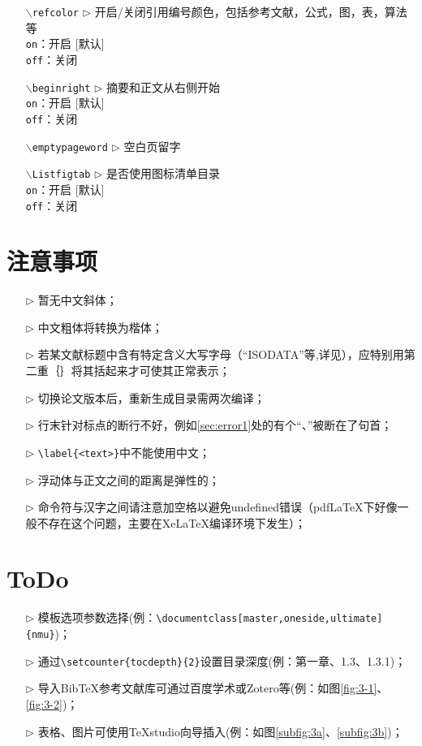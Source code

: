 \begin{itemize}[leftmargin=3cm]
	\item[{\tt  $\backslash$refcolor} $\triangleright$]  开启/关闭引用编号颜色，包括参考文献，公式，图，表，算法等\\
	\texttt{on}：开启 [默认]\\
	\texttt{off}：关闭
	\item[{\tt $\backslash$beginright} $\triangleright$]  摘要和正文从右侧开始\\
	\texttt{on}：开启 [默认]\\
	\texttt{off}：关闭
	\item[{\tt $\backslash$emptypageword} $\triangleright$]  空白页留字
	\item[{\tt $\backslash$Listfigtab} $\triangleright$]  是否使用图标清单目录\\
	\texttt{on}：开启 [默认]\\
	\texttt{off}：关闭
\end{itemize}


\section{注意事项}
\begin{itemize}
  \item[$\triangleright$] 暂无中文斜体；
  \item[$\triangleright$] 中文粗体将转换为楷体；
  \item[$\triangleright$] 若某文献标题中含有特定含义大写字母（“ISODATA”等,详见\cite{Li2017An}），应特别用第二重｛｝将其括起来才可使其正常表示；
  \item[$\triangleright$] 切换论文版本后，重新生成目录需两次编译；
  \item[$\triangleright$] 行末针对标点的断行不好，例如\ref{sec:error1}处的有个“、”被断在了句首；
  \item[$\triangleright$] \verb|\label{<text>}|中不能使用中文；
  \item[$\triangleright$] 浮动体与正文之间的距离是弹性的；
  \item[$\triangleright$] 命令符与汉字之间请注意加空格以避免undefined错误（pdfLaTeX下好像一般不存在这个问题，主要在XeLaTeX编译环境下发生）；
\end{itemize}

\section{ToDo}
\begin{itemize}
  \item[$\triangleright$] 模板选项参数选择(例：\verb|\documentclass[master,oneside,ultimate]{nmu}|)；
  \item[$\triangleright$] 通过\verb|\setcounter{tocdepth}{2}|设置目录深度(例：第一章、1.3、1.3.1)；
  \item[$\triangleright$] 导入BibTeX参考文献库可通过百度学术或Zotero等(例：如图\ref{fig:3-1}、\ref{fig:3-2})；
  \item[$\triangleright$] 表格、图片可使用TeXstudio向导插入(例：如图\ref{subfig:3a}、\ref{subfig:3b})；
\end{itemize}

